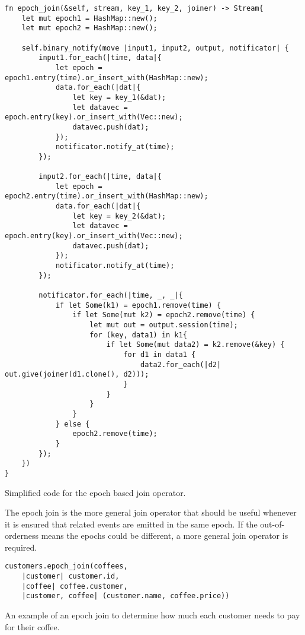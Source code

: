 \begin{listing}[H]
\begin{verbatim}
fn epoch_join(&self, stream, key_1, key_2, joiner) -> Stream{
    let mut epoch1 = HashMap::new();
    let mut epoch2 = HashMap::new();
    
    self.binary_notify(move |input1, input2, output, notificator| {
        input1.for_each(|time, data|{
            let epoch = epoch1.entry(time).or_insert_with(HashMap::new);
            data.for_each(|dat|{
                let key = key_1(&dat);
                let datavec = epoch.entry(key).or_insert_with(Vec::new);
                datavec.push(dat);
            });
            notificator.notify_at(time);
        });
        
        input2.for_each(|time, data|{
            let epoch = epoch2.entry(time).or_insert_with(HashMap::new);
            data.for_each(|dat|{
                let key = key_2(&dat);
                let datavec = epoch.entry(key).or_insert_with(Vec::new);
                datavec.push(dat);
            });
            notificator.notify_at(time);
        });
        
        notificator.for_each(|time, _, _|{
            if let Some(k1) = epoch1.remove(time) {
                if let Some(mut k2) = epoch2.remove(time) {
                    let mut out = output.session(time);
                    for (key, data1) in k1{
                        if let Some(mut data2) = k2.remove(&key) {
                            for d1 in data1 {
                                data2.for_each(|d2| out.give(joiner(d1.clone(), d2)));
                            }
                        }
                    }
                }
            } else {
                epoch2.remove(time);
            }
        });
    })
}
\end{verbatim}
  \caption{Simplified code for the epoch based join operator.}
  \label{lst:epoch-join}
\end{listing}

The epoch join is the more general join operator that should be useful whenever it is ensured that related events are emitted in the same epoch. If the out-of-orderness means the epochs could be different, a more general join operator is required.

\begin{listing}[H]
\begin{verbatim}
customers.epoch_join(coffees,
    |customer| customer.id, 
    |coffee| coffee.customer, 
    |customer, coffee| (customer.name, coffee.price))
\end{verbatim}
\caption{An example of an epoch join to determine how much each customer needs to pay for their coffee.}
\label{lst:epoch-join-example}
\end{listing}

